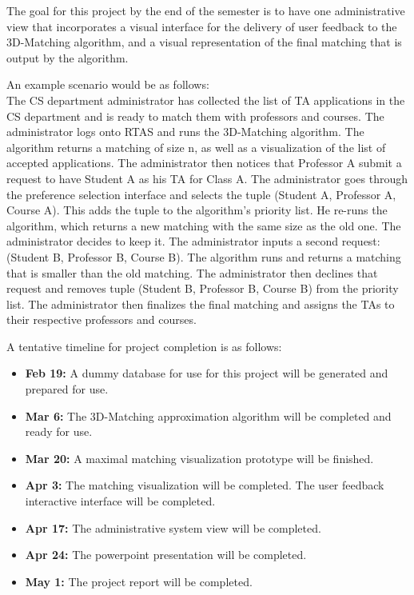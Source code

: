 The goal for this project by the end of the semester is to have one administrative view that incorporates a visual interface for the delivery of user feedback to the 3D-Matching algorithm, and a visual representation of the final matching that is output by the algorithm. 

An example scenario would be as follows:
\\
The CS department administrator has collected the list of TA applications in the CS department and is ready to match them with professors and courses. The administrator logs onto RTAS and runs the 3D-Matching algorithm. The algorithm returns a matching of size n, as well as a visualization of the list of accepted applications. The administrator then notices that Professor A submit a request to have Student A as his TA for Class A. The administrator goes through the preference selection interface and selects the tuple (Student A, Professor A, Course A). This adds the tuple to the algorithm's priority list. He re-runs the algorithm, which returns a new matching with the same size as the old one. The administrator decides to keep it. The administrator inputs a second request: (Student B, Professor B, Course B). The algorithm runs and returns a matching that is smaller than the old matching. The administrator then declines that request and removes tuple (Student B, Professor B, Course B) from the priority list. The administrator then finalizes the final matching and assigns the TAs to their respective professors and courses. 

A tentative timeline for project completion is as follows:

\begin{itemize} 
	\item{\textbf{Feb 19:} A dummy database for use for this project will be generated and prepared for use.} 
	
	\item{\textbf{Mar 6:} The 3D-Matching approximation algorithm will be completed and ready for use.}
	
	\item{\textbf{Mar 20:} A maximal matching visualization prototype will be finished.}
	
	\item{\textbf{Apr 3:} The matching visualization will be completed. The user feedback interactive interface will be completed.}
	
	\item{\textbf{Apr 17:} The administrative system view will be completed.}
	
	\item{\textbf{Apr 24:} The powerpoint presentation will be completed.}
	
	\item{\textbf{May 1:} The project report will be completed.}
	
\end{itemize}
